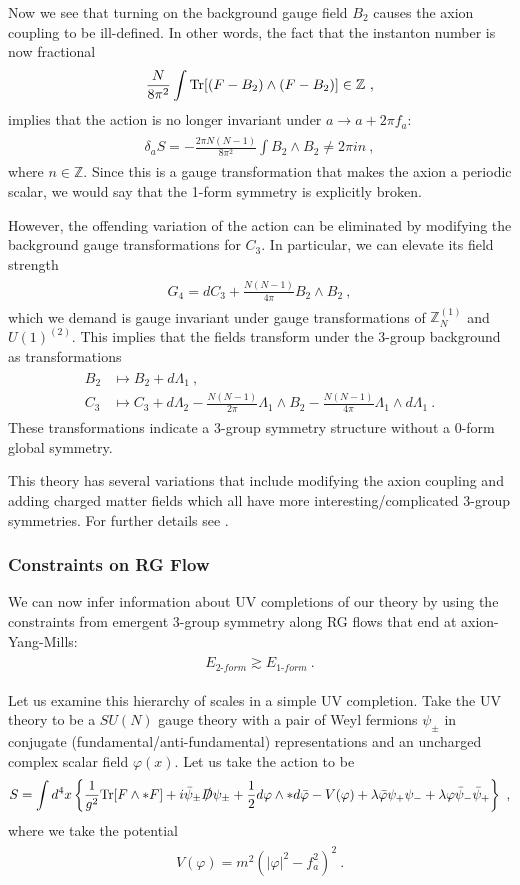 \documentclass[11pt]{article}
\newcommand{\eq}[1]{\begin{align}\begin{split}#1\end{split}\end{align}}
\def\Tr{{\rm Tr}}
\def\half{\frac{1}{2}}
\def\IZ{{\mathbb{Z}}}
\begin{document}
 Now we see that turning on the background gauge field $B_2$ causes the axion coupling to be ill-defined. In other words, the fact that the instanton number is now fractional 
\eq{
\frac{N}{8\pi^2}\int \Tr[(F-B_2)\wedge (F-B_2)]
\in \IZ~,
}
implies that the action is no longer invariant under $a\to a+2\pi f_a$:
\eq{
\delta_a S=-\frac{2\pi N(N-1)}{8\pi^2}\int B_2\wedge B_2\neq 2\pi i n ~,
}
where $n \in \IZ$. Since this is a gauge transformation that makes the axion a periodic scalar, we would say that the 1-form symmetry is explicitly broken.  
 
However, the offending variation of the action can be eliminated  by modifying the background gauge transformations for $C_3$. In particular, we can elevate its field strength
\eq{
G_4=dC_3+\frac{N(N-1)}{4\pi}B_2\wedge B_2~,
}
which we demand is gauge invariant under gauge transformations of $\IZ_N^{(1)}$ and $U(1)^{(2)}$. This implies that the fields transform under the 3-group background as transformations 
\eq{
B_2&\longmapsto B_2+d\Lambda_1~,\\
C_3&\longmapsto C_3+d\Lambda_2-\frac{N(N-1)}{2\pi}\Lambda_1\wedge B_2-\frac{N(N-1)}{4\pi}\Lambda_1\wedge d\Lambda_1~.
}
These transformations indicate a 3-group symmetry structure  without a 0-form global symmetry. 

This theory has several variations that include modifying the axion coupling and adding charged matter fields which all have more interesting/complicated 3-group symmetries. For further details see \cite{Brennan:2020ehu}. 

\subsubsection{Constraints on RG Flow}

We can now infer information about UV completions of our theory by using the constraints from emergent 3-group symmetry along RG flows that end at axion-Yang-Mills:
\eq{\label{3groupconst}
E_{2\text{-}form}\gtrsim E_{1\text{-}form}~.
} 

Let us examine this hierarchy of scales in a simple UV completion. Take the UV theory to be a $SU(N)$ gauge theory with a pair of Weyl fermions $\psi_\pm$ in conjugate (fundamental/anti-fundamental) representations and an uncharged complex scalar field $\varphi(x)$. Let us take the action to be 
\eq{
S=\int d^4x\left\{\frac{1}{g^2}\Tr[F\wedge \ast F]+i \bar\psi_\pm \slashed{D}\psi_\pm +\half d\varphi \wedge \ast d\bar\varphi-V(\varphi)+\lambda \bar\varphi \psi_+\psi_-+\lambda \varphi \bar\psi_-\bar\psi_+\right\}~,
}
where we take the potential 
\eq{
V(\varphi)=m^2(|\varphi|^2-f_a^2)^2~.
}
\end{document}
